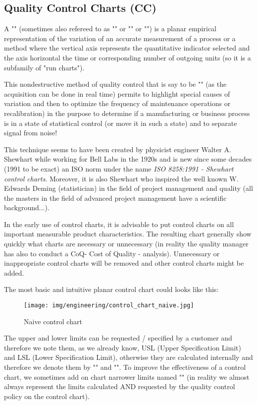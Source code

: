 	\pagebreak
	\subsection{Quality Control Charts (CC)}\label{quality control charts}
	A "" (sometimes also refereed to as "" or "" or "") is a planar empirical representation of the variation of an accurate measurement of a process or a method where the vertical axis represents the quantitative indicator selected and the axis horizontal the time or corresponding number of outgoing  units (so it is a subfamily of "run charts").

	This nondestructive method of quality control that is say to be "" (as the acquisition can be done in real time) permits to highlight special causes of variation and then to optimize the frequency of maintenance operations or recalibration) in the purpose to determine if a manufacturing or business process is in a state of statistical control (or move it in such a state) and to separate signal from noise! 
	
	This technique seems to have been created by physicist engineer Walter A. Shewhart while working for Bell Labs in the 1920s and is new since some decades (1991 to be exact) an ISO norm under the name \textit{ISO 8258:1991 - Shewhart control charts}. Moreover, it is also Shewhart who inspired the well known W. Edwards Deming (statistician) in the field of project management and quality (all the masters in the field of advanced project management have a scientific background...).

	In the early use of control charts, it is advisable to put control charts on all important measurable product characteristics. The resulting chart generally show quickly what charts are necessary or unnecessary (in reality the quality manager has also to conduct a CoQ- Cost of Quality - analysis). Unnecessary or inappropriate control charts will be removed and other control charts might be added.
	
	The most basic and intuitive planar control chart could looks like this:
	\begin{figure}[H]
		\centering
		\texttt{[image: img/engineering/control\_chart\_naive.jpg]}
		\caption{Naive control chart}
	\end{figure}
	The upper and lower limits can be requested / specified by a customer and therefore we note them, as we already know, USL (Upper Specification Limit) and LSL (Lower Specification Limit), otherwise they are calculated internally and therefore we denote them by "" and "". To improve the effectiveness of a control chart, we sometimes add on chart narrower limits named "" (in reality we almost always represent the limits  calculated AND requested by the quality control policy on the control chart). 
	
